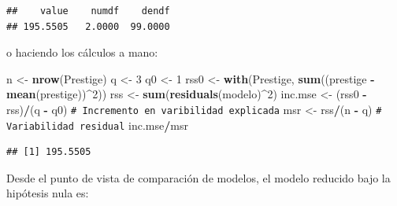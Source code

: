 \documentclass[
]{book}
\newenvironment{Shaded}{\begin{snugshade}}{\end{snugshade}}
\newcommand{\CommentTok}[1]{\textcolor[rgb]{0.56,0.35,0.01}{\textit{#1}}}
\newcommand{\DecValTok}[1]{\textcolor[rgb]{0.00,0.00,0.81}{#1}}
\newcommand{\FunctionTok}[1]{\textcolor[rgb]{0.13,0.29,0.53}{\textbf{#1}}}
\newcommand{\NormalTok}[1]{#1}
\newcommand{\OtherTok}[1]{\textcolor[rgb]{0.56,0.35,0.01}{#1}}
\newcommand{\SpecialCharTok}[1]{\textcolor[rgb]{0.81,0.36,0.00}{\textbf{#1}}}
\theoremstyle{break}
\theoremstyle{nonumberplain}
\renewcommand{\CommentTok}[1]{\textcolor[rgb]{0.41,0.41,0.41}{\texttt{#1}}}
\begin{document}
\begin{Shaded}
\end{Shaded}

\begin{verbatim}
##    value    numdf    dendf 
## 195.5505   2.0000  99.0000
\end{verbatim}

o haciendo los cálculos a mano:

\begin{Shaded}
\begin{Highlighting}[]
\NormalTok{n }\OtherTok{\textless{}{-}} \FunctionTok{nrow}\NormalTok{(Prestige)}
\NormalTok{q }\OtherTok{\textless{}{-}} \DecValTok{3}
\NormalTok{q0 }\OtherTok{\textless{}{-}} \DecValTok{1}
\NormalTok{rss0 }\OtherTok{\textless{}{-}} \FunctionTok{with}\NormalTok{(Prestige, }\FunctionTok{sum}\NormalTok{((prestige }\SpecialCharTok{{-}} \FunctionTok{mean}\NormalTok{(prestige))}\SpecialCharTok{\^{}}\DecValTok{2}\NormalTok{))}
\NormalTok{rss }\OtherTok{\textless{}{-}} \FunctionTok{sum}\NormalTok{(}\FunctionTok{residuals}\NormalTok{(modelo)}\SpecialCharTok{\^{}}\DecValTok{2}\NormalTok{)}
\NormalTok{inc.mse }\OtherTok{\textless{}{-}}\NormalTok{ (rss0 }\SpecialCharTok{{-}}\NormalTok{ rss)}\SpecialCharTok{/}\NormalTok{(q }\SpecialCharTok{{-}}\NormalTok{ q0)  }\CommentTok{\# Incremento en varibilidad explicada}
\NormalTok{msr }\OtherTok{\textless{}{-}}\NormalTok{  rss}\SpecialCharTok{/}\NormalTok{(n }\SpecialCharTok{{-}}\NormalTok{ q)               }\CommentTok{\# Variabilidad residual}
\NormalTok{inc.mse}\SpecialCharTok{/}\NormalTok{msr}
\end{Highlighting}
\end{Shaded}

\begin{verbatim}
## [1] 195.5505
\end{verbatim}

Desde el punto de vista de comparación de modelos, el modelo
reducido bajo la hipótesis nula es:
\end{document}

